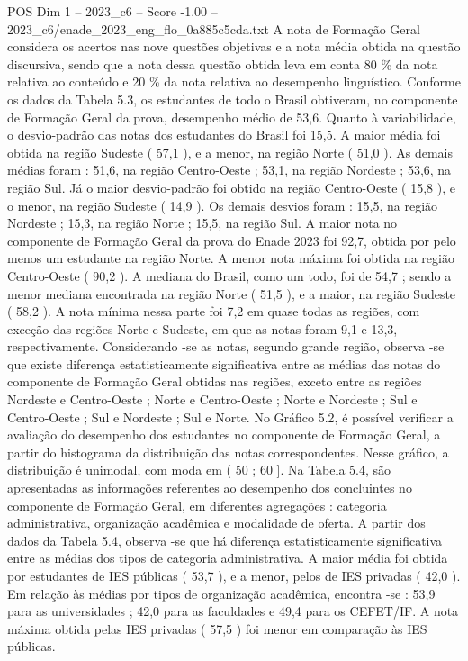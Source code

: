 \begin{textsample}{POS Dim 1 – 2023\_c6 – Score -1.00 – 2023\_c6/enade\_2023\_eng\_flo\_0a885c5cda.txt}
A nota de Formação Geral considera os acertos nas nove questões objetivas e a nota média obtida na questão discursiva, sendo que a nota dessa questão obtida leva em conta 80 \% da nota relativa ao conteúdo e 20 \% da nota relativa ao desempenho linguístico.
Conforme os dados da Tabela 5.3, os estudantes de todo o Brasil obtiveram, no componente de Formação Geral da prova, desempenho médio de 53,6.
Quanto à variabilidade, o desvio-padrão das notas dos estudantes do Brasil foi 15,5.
A maior média foi obtida na região Sudeste ( 57,1 ), e a menor, na região Norte ( 51,0 ).
As demais médias foram : 51,6, na região Centro-Oeste ; 53,1, na região Nordeste ; 53,6, na região Sul.
Já o maior desvio-padrão foi obtido na região Centro-Oeste ( 15,8 ), e o menor, na região Sudeste ( 14,9 ).
Os demais desvios foram : 15,5, na região Nordeste ; 15,3, na região Norte ; 15,5, na região Sul.
A maior nota no componente de Formação Geral da prova do Enade 2023 foi 92,7, obtida por pelo menos um estudante na região Norte.
A menor nota máxima foi obtida na região Centro-Oeste ( 90,2 ).
A mediana do Brasil, como um todo, foi de 54,7 ; sendo a menor mediana encontrada na região Norte ( 51,5 ), e a maior, na região Sudeste ( 58,2 ).
A nota mínima nessa parte foi 7,2 em quase todas as regiões, com exceção das regiões Norte e Sudeste, em que as notas foram 9,1 e 13,3, respectivamente.
Considerando -se as notas, segundo grande região, observa -se que existe diferença estatisticamente significativa entre as médias das notas do componente de Formação Geral obtidas nas regiões, exceto entre as regiões Nordeste e Centro-Oeste ; Norte e Centro-Oeste ; Norte e Nordeste ; Sul e Centro-Oeste ; Sul e Nordeste ; Sul e Norte.
No Gráfico 5.2, é possível verificar a avaliação do desempenho dos estudantes no componente de Formação Geral, a partir do histograma da distribuição das notas correspondentes.
Nesse gráfico, a distribuição é unimodal, com moda em ( 50 ; 60 ].
Na Tabela 5.4, são apresentadas as informações referentes ao desempenho dos concluintes no componente de Formação Geral, em diferentes agregações : categoria administrativa, organização acadêmica e modalidade de oferta.
A partir dos dados da Tabela 5.4, observa -se que há diferença estatisticamente significativa entre as médias dos tipos de categoria administrativa.
A maior média foi obtida por estudantes de IES públicas ( 53,7 ), e a menor, pelos de IES privadas ( 42,0 ).
Em relação às médias por tipos de organização acadêmica, encontra -se : 53,9 para as universidades ; 42,0 para as faculdades e 49,4 para os CEFET/IF.
A nota máxima obtida pelas IES privadas ( 57,5 ) foi menor em comparação às IES públicas.

\end{textsample}
